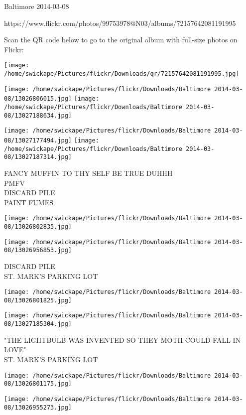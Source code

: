 \documentclass[10pt,letterpaper]{article}
\begin{document}
Baltimore 2014-03-08

https://www.flickr.com/photos/99753978@N03/albums/72157642081191995

Scan the QR code below to go to the original album with full-size photos on Flickr:

\texttt{[image: /home/swickape/Pictures/flickr/Downloads/qr/72157642081191995.jpg]}
\pagebreak

\texttt{[image: /home/swickape/Pictures/flickr/Downloads/Baltimore 2014-03-08/13026806015.jpg]}
\texttt{[image: /home/swickape/Pictures/flickr/Downloads/Baltimore 2014-03-08/13027188634.jpg]}

\texttt{[image: /home/swickape/Pictures/flickr/Downloads/Baltimore 2014-03-08/13027177494.jpg]}
\texttt{[image: /home/swickape/Pictures/flickr/Downloads/Baltimore 2014-03-08/13027187314.jpg]}

FANCY MUFFIN TO THY SELF BE TRUE DUHHH\\
PMFV\\
DISCARD PILE\\
PAINT FUMES
\pagebreak

\texttt{[image: /home/swickape/Pictures/flickr/Downloads/Baltimore 2014-03-08/13026802835.jpg]}

\vspace{0.25in}
\texttt{[image: /home/swickape/Pictures/flickr/Downloads/Baltimore 2014-03-08/13026956853.jpg]}

DISCARD PILE\\
ST. MARK'S PARKING LOT
\pagebreak

\texttt{[image: /home/swickape/Pictures/flickr/Downloads/Baltimore 2014-03-08/13026801825.jpg]}

\vspace{0.25in}
\texttt{[image: /home/swickape/Pictures/flickr/Downloads/Baltimore 2014-03-08/13027185304.jpg]}

"THE LIGHTBULB WAS INVENTED SO THEY MOTH COULD FALL IN LOVE"\\
ST. MARK'S PARKING LOT
\pagebreak

\texttt{[image: /home/swickape/Pictures/flickr/Downloads/Baltimore 2014-03-08/13026801175.jpg]}

\vspace{0.25in}
\texttt{[image: /home/swickape/Pictures/flickr/Downloads/Baltimore 2014-03-08/13026955273.jpg]}
\end{document}
